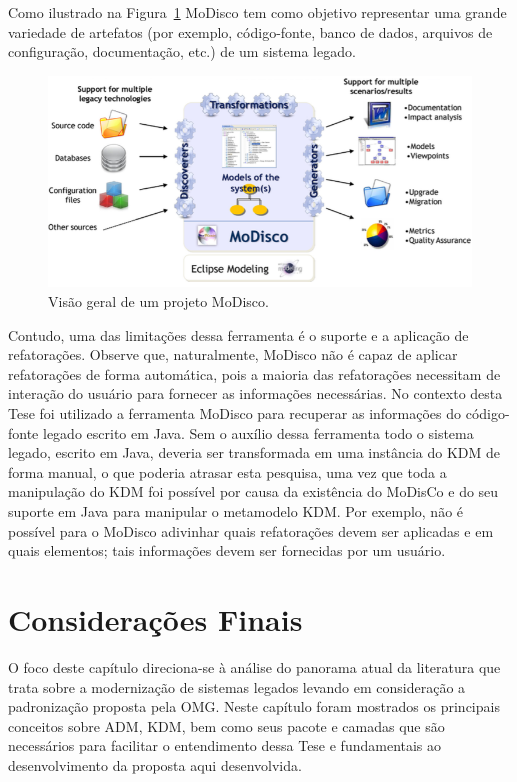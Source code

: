 Como ilustrado na Figura~\ref{fig:modisco_allArtefacts} MoDisco tem como objetivo representar uma grande variedade de artefatos (por exemplo, código-fonte, banco de dados, arquivos de configuração, documentação, etc.) de um sistema legado. 

\begin{figure}[!ht]
	\centering
	\includegraphics[scale=0.55]{images/modiscoAllArtefacts.png}
	\caption{Visão geral de um projeto MoDisco.}
	\label{fig:modisco_allArtefacts}
\end{figure}

Contudo, uma das limitações dessa ferramenta é o suporte e a aplicação de refatorações. Observe que, naturalmente, MoDisco não é capaz de aplicar refatorações de forma automática, pois a maioria das refatorações necessitam de interação do usuário para fornecer as informações necessárias. No contexto desta Tese foi utilizado a ferramenta MoDisco para recuperar as informações do código-fonte legado escrito em Java. Sem o auxílio dessa ferramenta todo o sistema legado, escrito em Java, deveria ser transformada em uma instância do KDM de forma manual, o que poderia atrasar esta pesquisa, uma vez que toda a manipulação do KDM foi possível por causa da existência do MoDisCo e do seu suporte em Java para manipular o metamodelo KDM. Por exemplo, não é possível para o MoDisco adivinhar quais refatorações devem ser aplicadas e em quais elementos; tais informações devem ser fornecidas por um usuário.

\section{Considerações Finais}\label{sec:consideracoes_finais}

O foco deste capítulo direciona-se à análise do panorama atual da literatura que trata sobre a modernização de sistemas legados levando em consideração a padronização proposta pela OMG. Neste capítulo foram mostrados os principais conceitos sobre ADM, KDM, bem como seus pacote e camadas que são necessários para facilitar o entendimento dessa Tese e fundamentais ao desenvolvimento da proposta aqui desenvolvida.


